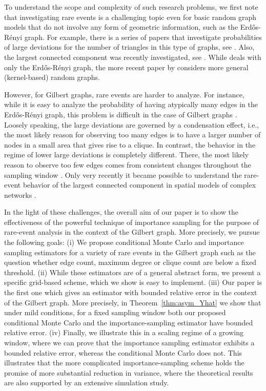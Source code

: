 \documentclass[pdflatex, sn-mathphys-ay]{sn-jnl}%
\theoremstyle{thmstyleone}%
\theoremstyle{thmstyletwo}%
\theoremstyle{thmstylethree}%
\begin{document}
%
%
To understand the scope and complexity of such research problems, we first note that investigating rare events is a challenging topic even for basic random graph models that do not involve any form of geometric information, such as the Erd\H{o}s-R\'enyi graph. For example, there is a series of papers that investigate probabilities of  large deviations for the number of triangles in this type of graphs, see \cite{tr1,tr3,tr2}. Also, the largest connected component was recently investigated, see \cite{comp1,comp2}. While \cite{comp1}  {  deals with only} the Erd\H{o}s-R\'enyi graph, the more recent paper by \cite{comp2} considers more general (kernel-based)  random  graphs.



%
%
However, for Gilbert graphs,  rare events are  harder to analyze. For instance, while it is easy to analyze the probability of having atypically many edges in the Erd\H{o}s-R\'enyi graph, this problem is difficult in the case of Gilbert graphs  \citep{harel}. Loosely speaking, the large deviations are governed by a condensation effect, i.e., the most likely reason for observing too many edges is to have a larger number of nodes %
in a small area that gives rise to a clique. In contrast, the behavior in the regime of lower large deviations is completely different. There, the most likely reason to observe too few edges comes from consistent changes throughout the sampling window \citep{lowTails}.  Only very recently it became possible to understand the rare-event behavior of the largest connected component in spatial models of complex networks \citep{comp3}.

In the light of these challenges, the overall aim of our paper is to show the effectiveness of the powerful technique of importance sampling for the purpose of rare-event analysis in the context of the Gilbert graph. More precisely, we pursue the following goals:
 (i) We propose conditional Monte Carlo and importance sampling estimators for a variety of rare events in the Gilbert graph such as the question whether edge count, maximum degree or clique count are below a fixed threshold. (ii) While these estimators are of a general abstract form, we present a specific grid-based scheme, which we show is easy to implement.
(iii)  Our paper is the first one which gives an estimator with bounded relative error in the context of the Gilbert graph. More precisely, in Theorem~\ref{thm:asym_Yhat} we show that  under mild conditions,  for a fixed sampling window both our proposed conditional Monte Carlo and the importance-sampling estimator have bounded relative error. (iv) Finally, we illustrate this  in a scaling regime of a growing window, where we can prove that the importance sampling estimator exhibits a bounded relative error, whereas the conditional Monte Carlo does not. This illustrates that the more complicated importance-sampling scheme holds the promise of more substantial reduction in variance, where the theoretical results are also supported by an extensive simulation study.
\end{document}
